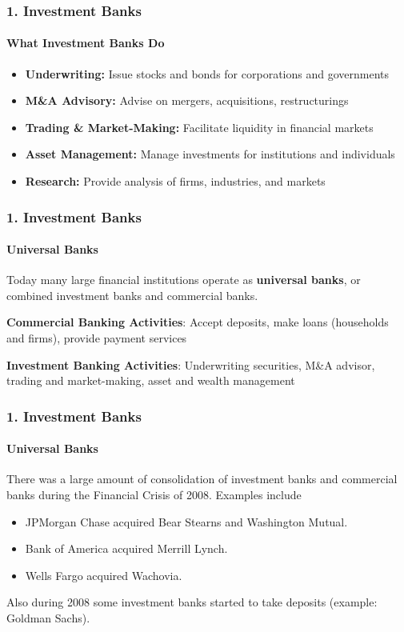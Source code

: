 \documentclass{beamer}
\begin{document}
\begin{frame}[t]
\frametitle{1. Investment Banks}
\framesubtitle{What Investment Banks Do}

    \begin{itemize}
        \item \textbf{Underwriting:} Issue stocks and bonds for corporations and governments
        \item \textbf{M\&A Advisory:} Advise on mergers, acquisitions, restructurings
        \item \textbf{Trading \& Market-Making:} Facilitate liquidity in financial markets
        \item \textbf{Asset Management:} Manage investments for institutions and individuals
        \item \textbf{Research:} Provide analysis of firms, industries, and markets
    \end{itemize}
\end{frame}

\begin{frame}[t]
\frametitle{1. Investment Banks}
\framesubtitle{Universal Banks}

    Today many large financial institutions operate as \textbf{universal banks}, or combined investment banks and commercial banks.   
    \vspace{0.3cm}
    
    \textbf{Commercial Banking Activities}: Accept deposits, make loans (households and firms), provide payment services
    \vspace{0.3cm}
    
    \textbf{Investment Banking Activities}: Underwriting securities, M\&A advisor, trading and market-making, asset and wealth management
    \vspace{0.3cm}

\end{frame}

\begin{frame}[t]
\frametitle{1. Investment Banks}
\framesubtitle{Universal Banks}

    There was a large amount of consolidation of investment banks and commercial banks during the Financial Crisis of 2008.   Examples include
     \begin{itemize}
            \item JPMorgan Chase acquired Bear Stearns and Washington Mutual.
            \item Bank of America acquired Merrill Lynch.
            \item Wells Fargo acquired Wachovia.
        \end{itemize}
    
    Also during 2008 some investment banks started to take deposits (example: Goldman Sachs).   
    
\end{frame}
\end{document}

